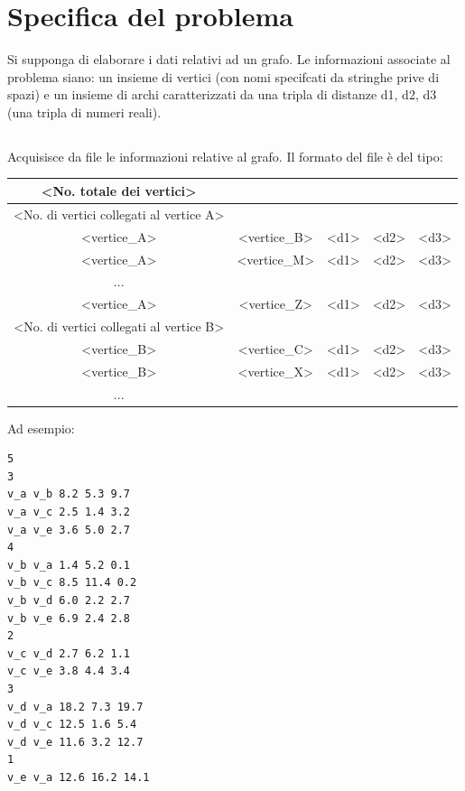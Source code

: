 \documentclass[11pt, a4paper, titlepage, block]{article}
\begin{document}
\section{Specifica del problema}
	Si supponga di elaborare i dati relativi ad un grafo. Le informazioni associate al problema siano: un insieme di vertici (con nomi specifcati da stringhe prive di spazi) e un insieme di archi caratterizzati da una tripla di distanze d1, d2, d3 (una tripla di numeri reali).
	\subsection{}
	Acquisisce da file le informazioni relative al grafo. Il formato del file \`{e} del tipo:\\
	\begin{tabular}{|c|c|c|c|c|}
\hline
	{\textless}No. totale dei vertici{\textgreater} & & & & \\
\hline
	{\textless}No. di vertici collegati al vertice A{\textgreater} & & & & \\
\hline
	{\textless}vertice\_A{\textgreater} & {\textless}vertice\_B{\textgreater} & {\textless}d1{\textgreater} & {\textless}d2{\textgreater} & {\textless}d3{\textgreater}\\
\hline
	{\textless}vertice\_A{\textgreater} & {\textless}vertice\_M{\textgreater} & {\textless}d1{\textgreater} & {\textless}d2{\textgreater} & {\textless}d3{\textgreater}\\
\hline
	... & & & &\\
\hline
	{\textless}vertice\_A{\textgreater} & {\textless}vertice\_Z{\textgreater} & {\textless}d1{\textgreater} & {\textless}d2{\textgreater} & {\textless}d3{\textgreater}\\
\hline
	{\textless}No. di vertici collegati al vertice B{\textgreater} & & & &\\
\hline
	{\textless}vertice\_B{\textgreater} & {\textless}vertice\_C{\textgreater} & {\textless}d1{\textgreater} & {\textless}d2{\textgreater} & {\textless}d3{\textgreater}\\
\hline
	{\textless}vertice\_B{\textgreater} & {\textless}vertice\_X{\textgreater} & {\textless}d1{\textgreater} & {\textless}d2{\textgreater} & {\textless}d3{\textgreater}\\
\hline
	... & & & &\\
\hline
\end{tabular}
Ad esempio:
\begin{lstlisting}
5
3
v_a v_b 8.2 5.3 9.7
v_a v_c 2.5 1.4 3.2
v_a v_e 3.6 5.0 2.7
4
v_b v_a 1.4 5.2 0.1
v_b v_c 8.5 11.4 0.2
v_b v_d 6.0 2.2 2.7
v_b v_e 6.9 2.4 2.8
2
v_c v_d 2.7 6.2 1.1
v_c v_e 3.8 4.4 3.4
3
v_d v_a 18.2 7.3 19.7
v_d v_c 12.5 1.6 5.4
v_d v_e 11.6 3.2 12.7
1
v_e v_a 12.6 16.2 14.1
\end{lstlisting}
\end{document}
